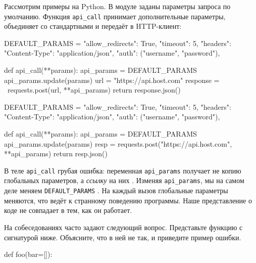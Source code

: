 
Рассмотрим примеры на Python. В модуле заданы параметры запроса по
умолчанию. Функция \verb|api_call| принимает дополнительные параметры,
объединяет со стандартными и передаёт в HTTP-клиент:

\ifx\DEVICETYPE\MOBILE

\begin{english}
  \begin{python/lines}
DEFAULT_PARAMS = {
    "allow_redirects": True,
    "timeout": 5,
    "headers": {"Content-Type":
                "application/json"},
    "auth": ("username", "password"),
}

def api_call(**params):
    api_params = DEFAULT_PARAMS
    api_params.update(params)
    url = "https://api.host.com"
    response = \
      requests.post(url, **api_params)
    return response.json()
  \end{python/lines}
\end{english}

\else

\begin{english}
  \begin{python/lines}
DEFAULT_PARAMS = {
    "allow_redirects": True,
    "timeout": 5,
    "headers": {"Content-Type": "application/json"},
    "auth": ("username", "password"),
}

def api_call(**params):
    api_params = DEFAULT_PARAMS
    api_params.update(params)
    resp = requests.post("https://api.host.com", **api_params)
    return resp.json()
  \end{python/lines}
\end{english}

\fi


В теле \verb|api_call| грубая ошибка: переменная \verb|api_params| получает
не копию глобальных параметров, а \emph{ссылку} на них \ifx\DEVICETYPE\MOBILE{}\else{}\fi. Изменяя \verb|api_params|, мы на самом деле меняем \verb|DEFAULT_PARAMS|
\ifx\DEVICETYPE\MOBILE\coderef{11}\else\coderef{10}\fi. На каждый вызов
глобальные параметры меняются, что ведёт к странному поведению программы.
Наше представление о коде не совпадает в тем, как он работает.

На собеседованиях часто задают следующий вопрос. Представьте функцию с
сигнатурой ниже. Объясните, что в ней не так, и приведите пример ошибки.

\begin{english}
  \begin{python}
def foo(bar=[]):
  \end{python}
\end{english}

